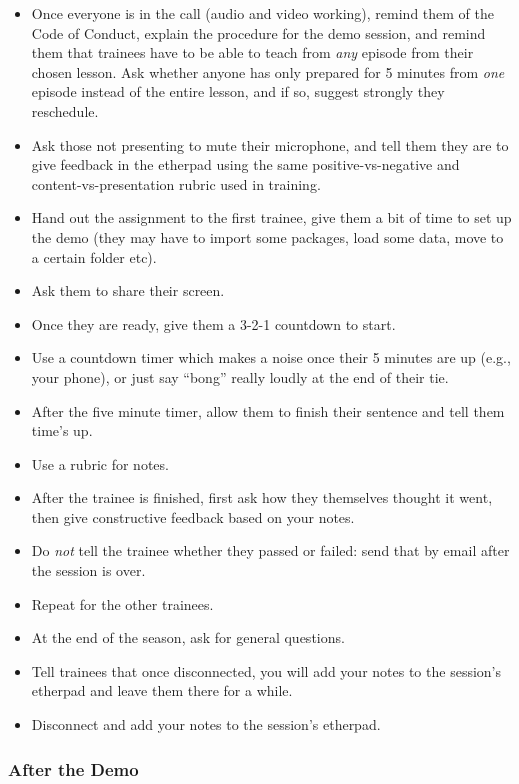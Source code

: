 \begin{itemize}
\itemsep1pt\parskip0pt
\item
  Once everyone is in the call (audio and video working), remind them of
  the Code of Conduct, explain the procedure for the demo session, and
  remind them that trainees have to be able to teach from \emph{any}
  episode from their chosen lesson. Ask whether anyone has only prepared
  for 5 minutes from \emph{one} episode instead of the entire lesson,
  and if so, suggest strongly they reschedule.
\item
  Ask those not presenting to mute their microphone, and tell them they
  are to give feedback in the etherpad using the same
  positive-vs-negative and content-vs-presentation rubric used in
  training.
\item
  Hand out the assignment to the first trainee, give them a bit of time
  to set up the demo (they may have to import some packages, load some
  data, move to a certain folder etc).
\item
  Ask them to share their screen.
\item
  Once they are ready, give them a 3-2-1 countdown to start.
\item
  Use a countdown timer which makes a noise once their 5 minutes are up
  (e.g., your phone), or just say ``bong'' really loudly at the end of
  their tie.
\item
  After the five minute timer, allow them to finish their sentence and
  tell them time's up.
\item
  Use a rubric for notes.
\item
  After the trainee is finished, first ask how they themselves thought
  it went, then give constructive feedback based on your notes.
\item
  Do \emph{not} tell the trainee whether they passed or failed: send
  that by email after the session is over.
\item
  Repeat for the other trainees.
\item
  At the end of the season, ask for general questions.
\item
  Tell trainees that once disconnected, you will add your notes to the
  session's etherpad and leave them there for a while.
\item
  Disconnect and add your notes to the session's etherpad.
\end{itemize}

\subsubsection{After the Demo}\label{after-the-demo}

